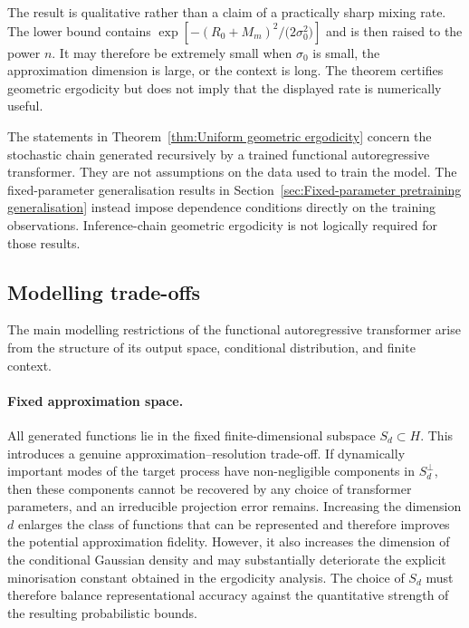 \begin{remark}\label{rem:Size of the minorisation constant}
The result is qualitative rather than a claim of a practically sharp mixing rate. The lower bound contains
\(
\exp\left[-{(R_0+M_m)^2}/{(2\sigma_0^2})\right]
\)
and is then raised to the power \(n\). It may therefore be extremely small when \(\sigma_0\) is small, the approximation dimension is large, or the context is long. The theorem certifies geometric ergodicity but does not imply that the displayed rate is numerically useful.
\end{remark}

\begin{remark}\label{rem:Inference ergodicity separate from pretraining}
The statements in Theorem~\ref{thm:Uniform geometric ergodicity} concern the stochastic chain generated recursively by a trained functional autoregressive transformer. They are not assumptions on the data used to train the model. The fixed-parameter generalisation results in Section~\ref{sec:Fixed-parameter pretraining generalisation} instead impose dependence conditions directly on the training observations. Inference-chain geometric ergodicity is not logically required for those results.
\end{remark}

\subsection{Modelling trade-offs}\label{subsec:Interpretation and modelling trade-offs}

The main modelling restrictions of the functional autoregressive transformer arise from the structure of its output space, conditional distribution, and finite context.

\paragraph{Fixed approximation space.}
All generated functions lie in the fixed finite-dimensional subspace \(S_d\subset H\). This introduces a genuine approximation--resolution trade-off. If dynamically important modes of the target process have non-negligible components in \(S_d^\perp\), then these components cannot be recovered by any choice of transformer parameters, and an irreducible projection error remains. Increasing the dimension \(d\) enlarges the class of functions that can be represented and therefore improves the potential approximation fidelity. However, it also increases the dimension of the conditional Gaussian density and may substantially deteriorate the explicit minorisation constant obtained in the ergodicity analysis. The choice of \(S_d\) must therefore balance representational accuracy against the quantitative strength of the resulting probabilistic bounds.

